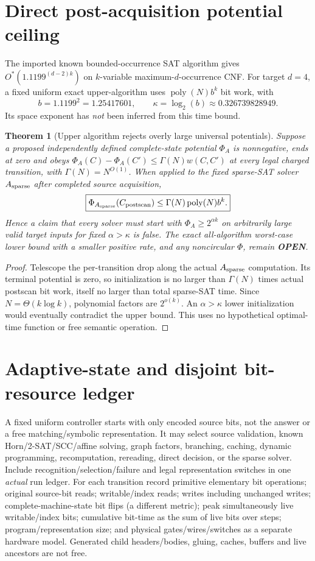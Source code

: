 \documentclass[11pt]{article}
\newtheorem{theorem}{Theorem}
\begin{document}
\section{Direct post-acquisition potential ceiling}
The imported known bounded-occurrence SAT algorithm gives
$O^*(1.1199^{(d-2)k})$ on $k$-variable maximum-$d$-occurrence
CNF. For target $d=4$, a fixed uniform exact upper-algorithm
uses $\operatorname{poly}(N)b^k$ bit work, with
\[
 b=1.1199^2=1.25417601,\qquad
 \kappa=\log_2(b)\approx0.326739828949.
\]
Its space exponent has \emph{not} been inferred from this time
bound.
\begin{theorem}[Upper algorithm rejects overly large universal potentials]
Suppose a proposed independently defined complete-state potential
$\Phi_A$ is nonnegative, ends at zero and obeys
$\Phi_A(C)-\Phi_A(C')\le\Gamma(N)w(C,C')$
at every legal charged transition, with $\Gamma(N)=N^{O(1)}$.
When applied to the fixed sparse-SAT solver
$A_{\rm sparse}$ after completed source acquisition,
\[
 \boxed{\Phi_{A_{\rm sparse}}(C_{\rm postscan})
 \le \Gamma(N)\operatorname{poly}(N)b^k.}
\]
Hence a claim that \emph{every} solver must start with
$\Phi_A\ge2^{\alpha k}$ on arbitrarily large valid target inputs
for fixed $\alpha>\kappa$ is false.
The exact all-algorithm worst-case lower bound with a smaller
positive rate, and any noncircular $\Phi$, remain \textbf{OPEN}.
\end{theorem}
\begin{proof}
Telescope the per-transition drop along the actual
$A_{\rm sparse}$ computation. Its terminal potential is zero,
so initialization is no larger than $\Gamma(N)$ times actual
postscan bit work, itself no larger than total sparse-SAT time.
Since $N=\Theta(k\log k)$, polynomial factors are $2^{o(k)}$.
An $\alpha>\kappa$ lower initialization would eventually
contradict the upper bound. This uses no hypothetical
optimal-time function or free semantic operation.
\end{proof}

\section{Adaptive-state and disjoint bit-resource ledger}
A fixed uniform controller starts with only encoded source bits,
not the answer or a free matching/symbolic representation.
It may select source validation, known Horn/2-SAT/SCC/affine solving,
graph factors, branching, caching, dynamic programming,
recomputation, rereading, direct decision, or the sparse solver.
Include recognition/selection/failure and legal representation
switches in one \emph{actual} run ledger. For each transition record
primitive elementary bit operations; original source-bit reads;
writable/index reads; writes including unchanged writes;
complete-machine-state bit flips (a different metric);
peak simultaneously live writable/index bits;
cumulative bit-time as the sum of live bits over steps;
program/representation size; and physical gates/wires/switches
as a separate hardware model. Generated child headers/bodies,
gluing, caches, buffers and live ancestors are not free.
\end{document}

